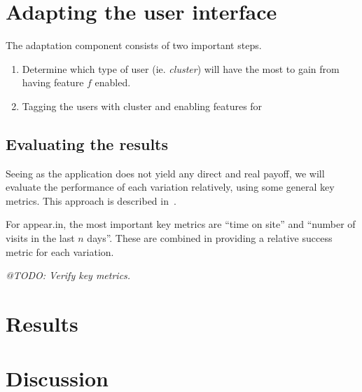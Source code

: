 \section{Adapting the user interface} %
\label{sec:adapting_the_user_interface}

The adaptation component consists of two important steps.

\begin{enumerate}
  \item Determine which type of user (ie. \emph{cluster}) will have the most to gain from having feature $f$ enabled.
  \item Tagging the users with cluster and enabling features for
\end{enumerate}

\subsection{Evaluating the results} %
\label{sub:evaluating_the_results}

Seeing as the application does not yield any direct and real payoff, we will evaluate the performance of each variation relatively, using some general key metrics. This approach is described in~\cite{Yue2012}.

For appear.in, the most important key metrics are ``time on site'' and ``number of visits in the last $n$ days''. These are combined in providing a relative success metric for each variation.

\emph{@TODO: Verify key metrics.}




\section{Results} %
\label{sec:results}


\section{Discussion} %
\label{sec:discussion}

